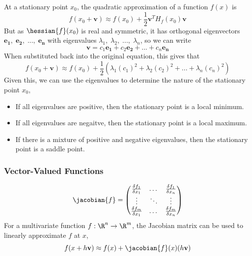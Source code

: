 At a stationary point \(x_0\), the quadratic approximation of a function \(f(x)\) is
\begin{equation}
    f(x_0 + \mathbf{v}) \approx f(x_0) + \frac{1}{2}\mathbf{v}^T H_f(x_0)\mathbf{v}
\end{equation}
But as \(\hessian{f}(x_0)\) is real and symmetric, it has orthogonal eigenvectors \(\mathbf{e_1},\;\mathbf{e_2},\;...,\;\mathbf{e_n}\) with eigenvalues \(\lambda_1,\;\lambda_2,\;...,\;\lambda_n\), so we can write
\begin{equation}
    \mathbf{v} = c_1\mathbf{e_1} + c_2\mathbf{e_2} + ... + c_n\mathbf{e_n}
\end{equation}
When substituted back into the original equation, this gives that
\begin{equation}
    f(x_0 + \mathbf{v}) \approx f(x_0) + \frac{1}{2}\left(\lambda_1(c_1)^2 + \lambda_2(c_2)^2 + ... + \lambda_n(c_n)^2\right)
\end{equation}
Given this, we can use the eigenvalues to determine the nature of the stationary point \(x_0\),
\begin{itemize}
    \item If all eigenvalues are positive, then the stationary point is a local minimum.
    \item If all eigenvalues are negaitve, then the stationary point is a local maximum.
    \item If there is a mixture of positive and negative eigenvalues, then the stationary point is a saddle point.
\end{itemize}

\subsubsection{Vector-Valued Functions}


\begin{equation}
    \jacobian{f} = \begin{pmatrix}
        \frac{\delta f_1}{\delta x_1} & \dots & \frac{\delta f_1}{\delta x_n} \\
        \vdots & \ddots & \vdots \\
        \frac{\delta f_m}{\delta x_1} & \dots & \frac{\delta f_m}{\delta x_n} \\
    \end{pmatrix}
\end{equation}
For a multivariate function \(f:\R^n\rightarrow\R^m\), the Jacobian matrix can be used to linearly approximate \(f\) at \(x\),
\begin{equation}
    f(x + h\mathbf{v}) \approx f(x) + \jacobian{f}(x)(h\mathbf{v})
\end{equation} 

